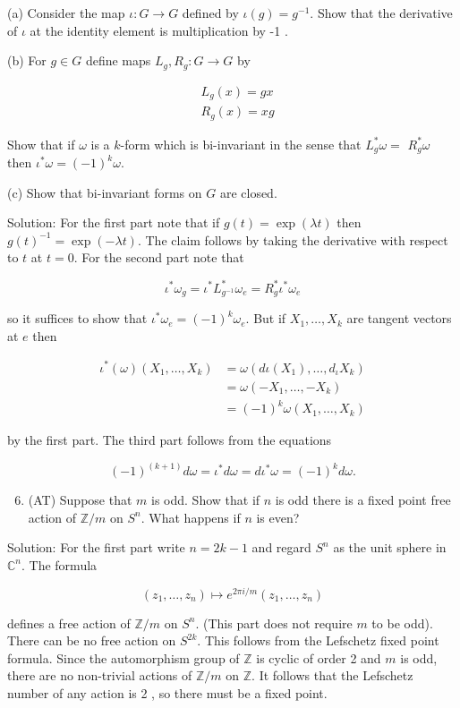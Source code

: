 \documentclass[10pt]{article}
\begin{document}
(a) Consider the map $\iota: G \rightarrow G$ defined by $\iota(g)=g^{-1}$. Show that the derivative of $\iota$ at the identity element is multiplication by -1 .

(b) For $g \in G$ define maps $L_{g}, R_{g}: G \rightarrow G$ by

$$
\begin{aligned}
& L_{g}(x)=g x \\
& R_{g}(x)=x g
\end{aligned}
$$

Show that if $\omega$ is a $k$-form which is bi-invariant in the sense that $L_{g}^{*} \omega=$ $R_{g}^{*} \omega$ then $\iota^{*} \omega=(-1)^{k} \omega$.

(c) Show that bi-invariant forms on $G$ are closed.

Solution: For the first part note that if $g(t)=\exp (\lambda t)$ then $g(t)^{-1}=\exp (-\lambda t)$. The claim follows by taking the derivative with respect to $t$ at $t=0$. For the second part note that

$$
\iota^{*} \omega_{g}=\iota^{*} L_{g^{-1}}^{*} \omega_{e}=R_{g}^{*} \iota^{*} \omega_{e}
$$

so it suffices to show that $\iota^{*} \omega_{e}=(-1)^{k} \omega_{e}$. But if $X_{1}, \ldots, X_{k}$ are tangent vectors at $e$ then

$$
\begin{aligned}
\iota^{*}(\omega)\left(X_{1}, \ldots, X_{k}\right) & =\omega\left(d \iota\left(X_{1}\right), \ldots, d_{\iota} X_{k}\right) \\
& =\omega\left(-X_{1}, \ldots,-X_{k}\right) \\
& =(-1)^{k} \omega\left(X_{1}, \ldots, X_{k}\right)
\end{aligned}
$$

by the first part. The third part follows from the equations

$$
(-1)^{(k+1)} d \omega=\iota^{*} d \omega=d \iota^{*} \omega=(-1)^{k} d \omega .
$$

\begin{enumerate}
  \setcounter{enumi}{5}
  \item (AT) Suppose that $m$ is odd. Show that if $n$ is odd there is a fixed point free action of $\mathbb{Z} / m$ on $S^{n}$. What happens if $n$ is even?
\end{enumerate}

Solution: For the first part write $n=2 k-1$ and regard $S^{n}$ as the unit sphere in $\mathbb{C}^{n}$. The formula

$$
\left(z_{1}, \ldots, z_{n}\right) \mapsto e^{2 \pi i / m}\left(z_{1}, \ldots, z_{n}\right)
$$

defines a free action of $\mathbb{Z} / m$ on $S^{n}$. (This part does not require $m$ to be odd). There can be no free action on $S^{2 k}$. This follows from the Lefschetz fixed point formula. Since the automorphism group of $\mathbb{Z}$ is cyclic of order 2 and $m$ is odd, there are no non-trivial actions of $\mathbb{Z} / m$ on $\mathbb{Z}$. It follows that the Lefschetz number of any action is 2 , so there must be a fixed point.
\end{document}
